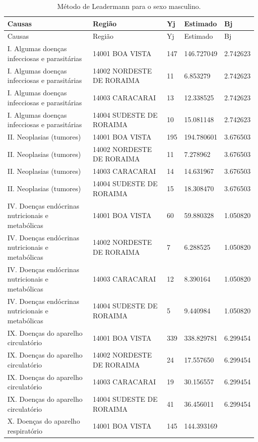 \documentclass[
  12pt,
  a4paper,
]{scrreprt}
\begin{document}
\begin{longtable}[]{@{}lllll@{}}
\caption{Método de Leadermann para o sexo
masculino.}\label{T_732c5}\tabularnewline
\toprule\noalign{}
Causas & Região & Yj & Estimado & Bj \\
\midrule\noalign{}
\endfirsthead
\toprule\noalign{}
Causas & Região & Yj & Estimado & Bj \\
\midrule\noalign{}
\endhead
\bottomrule\noalign{}
\endlastfoot
I. Algumas doenças infecciosas e parasitárias & 14001 BOA VISTA & 147 &
146.727049 & 2.742623 \\
I. Algumas doenças infecciosas e parasitárias & 14002 NORDESTE DE
RORAIMA & 11 & 6.853279 & 2.742623 \\
I. Algumas doenças infecciosas e parasitárias & 14003 CARACARAI & 13 &
12.338525 & 2.742623 \\
I. Algumas doenças infecciosas e parasitárias & 14004 SUDESTE DE RORAIMA
& 10 & 15.081148 & 2.742623 \\
II. Neoplasias (tumores) & 14001 BOA VISTA & 195 & 194.780601 &
3.676503 \\
II. Neoplasias (tumores) & 14002 NORDESTE DE RORAIMA & 11 & 7.278962 &
3.676503 \\
II. Neoplasias (tumores) & 14003 CARACARAI & 14 & 14.631967 &
3.676503 \\
II. Neoplasias (tumores) & 14004 SUDESTE DE RORAIMA & 15 & 18.308470 &
3.676503 \\
IV. Doenças endócrinas nutricionais e metabólicas & 14001 BOA VISTA & 60
& 59.880328 & 1.050820 \\
IV. Doenças endócrinas nutricionais e metabólicas & 14002 NORDESTE DE
RORAIMA & 7 & 6.288525 & 1.050820 \\
IV. Doenças endócrinas nutricionais e metabólicas & 14003 CARACARAI & 12
& 8.390164 & 1.050820 \\
IV. Doenças endócrinas nutricionais e metabólicas & 14004 SUDESTE DE
RORAIMA & 5 & 9.440984 & 1.050820 \\
IX. Doenças do aparelho circulatório & 14001 BOA VISTA & 339 &
338.829781 & 6.299454 \\
IX. Doenças do aparelho circulatório & 14002 NORDESTE DE RORAIMA & 24 &
17.557650 & 6.299454 \\
IX. Doenças do aparelho circulatório & 14003 CARACARAI & 19 & 30.156557
& 6.299454 \\
IX. Doenças do aparelho circulatório & 14004 SUDESTE DE RORAIMA & 41 &
36.456011 & 6.299454 \\
X. Doenças do aparelho respiratório & 14001 BOA VISTA & 145 & 144.393169

\end{longtable}
\end{document}
